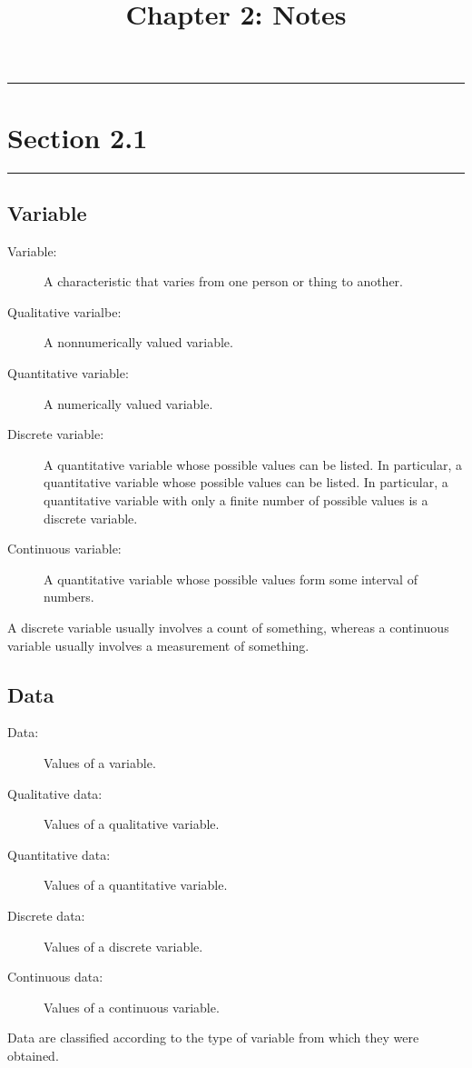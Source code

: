 \documentclass[12pt]{article}
\title{Chapter 2: Notes}
\author{}
\begin{document}
    \maketitle

    \noindent\rule{\textwidth}{0.4pt}
    \section*{Section 2.1}
    \noindent\rule{\textwidth}{0.4pt}
        \subsection*{Variable}
            \begin{description}
                \item[Variable:] A characteristic that varies from one person or thing to
                another.
                \item[Qualitative varialbe:] A nonnumerically valued variable.
                \item[Quantitative variable:] A numerically valued variable.
                \item[Discrete variable:] A quantitative variable whose possible values can
                be listed. In particular, a quantitative variable whose possible values can
                be listed. In particular, a quantitative variable with only a finite number
                of possible values is a discrete variable.
                \item[Continuous variable:] A quantitative variable whose possible values
                form some interval of numbers.    
            \end{description}
            A discrete variable usually involves a count of something, whereas a continuous
            variable usually involves a measurement of something.

        \subsection*{Data}
            \begin{description}
                \item[Data:] Values of a variable.
                \item[Qualitative data:] Values of a qualitative variable.
                \item[Quantitative data:] Values of a quantitative variable.
                \item[Discrete data:] Values of a discrete variable.
                \item[Continuous data:] Values of a continuous variable.    
            \end{description}
            Data are classified according to the type of variable from which they were
            obtained.
            
\end{document}
